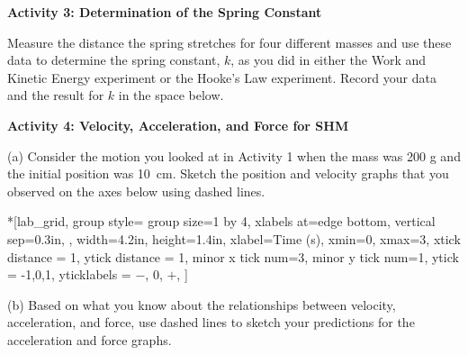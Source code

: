 %

\textbf{Activity 3: Determination of the Spring Constant }

Measure the distance the spring stretches for four different masses and use
these data to determine the spring constant, $k$, as you did in either the Work and Kinetic Energy experiment or the Hooke's Law experiment. Record your data and the result for $k$ in the space below.
\answerspace{40mm}

\pagebreak[2]
\textbf{Activity 4: Velocity, Acceleration, and Force for SHM} 

(a) Consider the motion you looked at in Activity 1 when the mass was 200 g
and the initial position was 10~cm. Sketch the position and velocity graphs
that you observed on the axes below using dashed lines.


\begin{lab_groupplot}*{}[lab_grid,
	group style={
		group size=1 by 4,
		xlabels at=edge bottom,
		vertical sep=0.3in,
		},
	width=4.2in,  height=1.4in,
	xlabel=Time (s),
	xmin=0, xmax=3,
	xtick distance = 1, 
	ytick distance = 1, 
	minor x tick num=3,
	minor y tick num=1,
	ytick = {-1,0,1},
	yticklabels = {$-$, 0, $+$},
	]
\nextgroupplot[
	ytick distance = 1, 
	minor y tick num=3,
	ymin=0,ymax=1, 
	ylabel={Position (m)},
	]
\nextgroupplot[
	ymin=-1,ymax=1, 
	ylabel={Velocity (m/s)},
	]
\nextgroupplot[
	ymin=-1,ymax=1, 
	ylabel={Acceleration (m/s$^2$)},
	]
\nextgroupplot[
	ymin=-1,ymax=1, 
	ylabel={Force (N)},
	]
\end{lab_groupplot}

(b) Based on what you know about the relationships between velocity, 
acceleration, and force, use dashed lines to sketch your predictions for the 
acceleration and force graphs.

